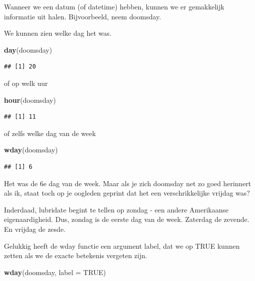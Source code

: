 \documentclass[]{tufte-book}
\newenvironment{Shaded}{}{}
\newcommand{\DataTypeTok}[1]{\textcolor[rgb]{0.56,0.13,0.00}{#1}}
\newcommand{\KeywordTok}[1]{\textcolor[rgb]{0.00,0.44,0.13}{\textbf{#1}}}
\newcommand{\NormalTok}[1]{#1}
\newcommand{\OtherTok}[1]{\textcolor[rgb]{0.00,0.44,0.13}{#1}}
\begin{document}
Wanneer we een datum (of datetime) hebben, kunnen we er gemakkelijk informatie uit halen. Bijvoorbeeld, neem doomsday.

We kunnen zien welke dag het was.

\begin{Shaded}
\begin{Highlighting}[]
\KeywordTok{day}\NormalTok{(doomsday)}
\end{Highlighting}
\end{Shaded}

\begin{verbatim}
## [1] 20
\end{verbatim}

of op welk uur

\begin{Shaded}
\begin{Highlighting}[]
\KeywordTok{hour}\NormalTok{(doomsday)}
\end{Highlighting}
\end{Shaded}

\begin{verbatim}
## [1] 11
\end{verbatim}

of zelfs welke dag van de week

\begin{Shaded}
\begin{Highlighting}[]
\KeywordTok{wday}\NormalTok{(doomsday)}
\end{Highlighting}
\end{Shaded}

\begin{verbatim}
## [1] 6
\end{verbatim}

Het was de 6e dag van de week. Maar als je zich doomsday net zo goed herinnert als ik, staat toch op je oogleden geprint dat het een verschrikkelijke vrijdag was?

Inderdaad, lubridate begint te tellen op zondag - een andere Amerikaanse eigenaardigheid. Dus, zondag is de eerste dag van de week. Zaterdag de zevende. En vrijdag de zesde.

Gelukkig heeft de wday functie een argument label, dat we op TRUE kunnen zetten als we de exacte betekenis vergeten zijn.

\begin{Shaded}
\begin{Highlighting}[]
\KeywordTok{wday}\NormalTok{(doomsday, }\DataTypeTok{label =} \OtherTok{TRUE}\NormalTok{)}
\end{Highlighting}
\end{Shaded}
\end{document}
